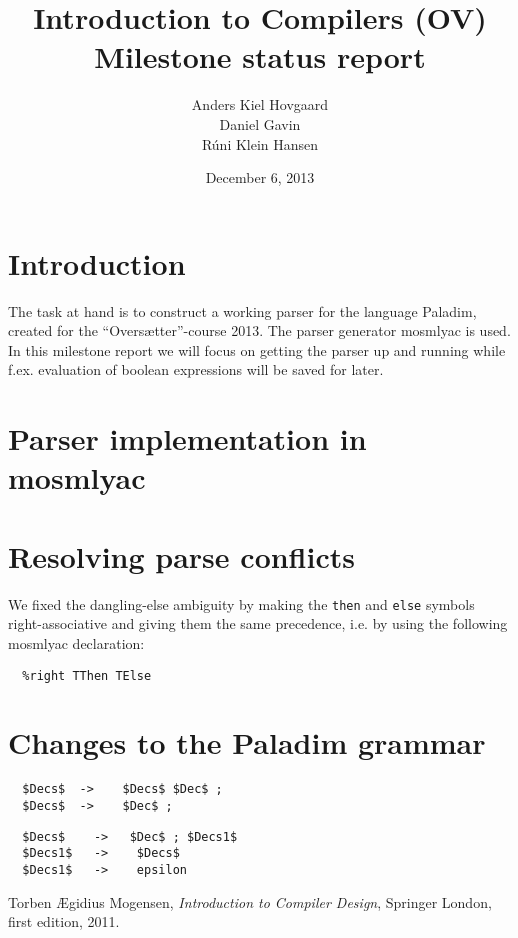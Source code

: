 \documentclass[12pt,a4paper]{article}
\begin{document}
\title{Introduction to Compilers (OV)\\
       Milestone status report}
\author{Anders Kiel Hovgaard\\
        Daniel Gavin\\
        Rúni Klein Hansen}
\date{December 6, 2013}
\maketitle

\section{Introduction}
The task at hand is to construct a working parser for the language Paladim,
created for the ``Oversætter''-course 2013. The parser generator mosmlyac is
used.\\
In this milestone report we will focus on getting the parser up and running
while f.ex. evaluation of boolean expressions will be saved for later.


\section{Parser implementation in mosmlyac}


\section{Resolving parse conflicts}
We fixed the dangling-else ambiguity by making the \texttt{then} and
\texttt{else} symbols right-associative and giving them the same precedence,
i.e. by using the following mosmlyac declaration:
\begin{verbatim}
  %right TThen TElse 
\end{verbatim}

\section{Changes to the Paladim grammar}
\begin{lstlisting}
  $Decs$  ->    $Decs$ $Dec$ ;
  $Decs$  ->    $Dec$ ;
\end{lstlisting}
\begin{lstlisting}
  $Decs$    ->   $Dec$ ; $Decs1$
  $Decs1$   ->    $Decs$
  $Decs1$   ->    epsilon
\end{lstlisting}


\begin{thebibliography}{9}
    Torben Ægidius Mogensen,
    \emph{Introduction to Compiler Design},
    Springer London, first edition, 2011.
\end{thebibliography}
\end{document}
